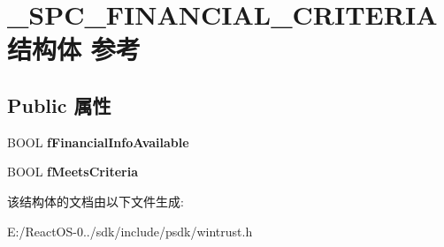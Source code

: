 \hypertarget{struct___s_p_c___f_i_n_a_n_c_i_a_l___c_r_i_t_e_r_i_a}{}\section{\+\_\+\+S\+P\+C\+\_\+\+F\+I\+N\+A\+N\+C\+I\+A\+L\+\_\+\+C\+R\+I\+T\+E\+R\+I\+A结构体 参考}
\label{struct___s_p_c___f_i_n_a_n_c_i_a_l___c_r_i_t_e_r_i_a}
\subsection*{Public 属性}
\begin{DoxyCompactItemize}
\item 
\mbox{\label{struct___s_p_c___f_i_n_a_n_c_i_a_l___c_r_i_t_e_r_i_a_a36c3131044f2517a5693444acfc83788}} 
B\+O\+OL {\bfseries f\+Financial\+Info\+Available}
\item 
\mbox{\label{struct___s_p_c___f_i_n_a_n_c_i_a_l___c_r_i_t_e_r_i_a_a9f6aca5bdd9b562b1b62d6a49038c571}} 
B\+O\+OL {\bfseries f\+Meets\+Criteria}
\end{DoxyCompactItemize}


该结构体的文档由以下文件生成\+:\begin{DoxyCompactItemize}
\item 
E\+:/\+React\+O\+S-\/0../sdk/include/psdk/wintrust.\+h\end{DoxyCompactItemize}

